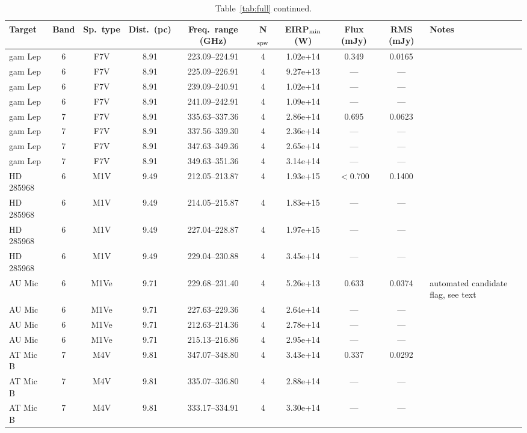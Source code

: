 \documentclass{openjournal}
\begin{document}
\begin{table}
\centering
\scriptsize
\caption{Table~\ref{tab:full} continued.}
\label{tab:full2}
\begin{tabularx}{\textwidth}{@{}l c c c c c c c c X@{}}
\hline
Target & Band & Sp.\ type & Dist.\ (pc) & Freq.\ range (GHz) & N$_{\rm spw}$ & EIRP$_{\rm min}$ (W) & Flux (mJy) & RMS (mJy) & Notes \\
\hline
gam Lep & 6 & F7V & 8.91 & 223.09--224.91 & 4 & 1.02e+14 & 0.349 & 0.0165 &  \\
gam Lep & 6 & F7V & 8.91 & 225.09--226.91 & 4 & 9.27e+13 & --- & --- &  \\
gam Lep & 6 & F7V & 8.91 & 239.09--240.91 & 4 & 1.02e+14 & --- & --- &  \\
gam Lep & 6 & F7V & 8.91 & 241.09--242.91 & 4 & 1.09e+14 & --- & --- &  \\
gam Lep & 7 & F7V & 8.91 & 335.63--337.36 & 4 & 2.86e+14 & 0.695 & 0.0623 &  \\
gam Lep & 7 & F7V & 8.91 & 337.56--339.30 & 4 & 2.36e+14 & --- & --- &  \\
gam Lep & 7 & F7V & 8.91 & 347.63--349.36 & 4 & 2.65e+14 & --- & --- &  \\
gam Lep & 7 & F7V & 8.91 & 349.63--351.36 & 4 & 3.14e+14 & --- & --- &  \\
HD 285968 & 6 & M1V & 9.49 & 212.05--213.87 & 4 & 1.93e+15 & $<$0.700 & 0.1400 &  \\
HD 285968 & 6 & M1V & 9.49 & 214.05--215.87 & 4 & 1.83e+15 & --- & --- &  \\
HD 285968 & 6 & M1V & 9.49 & 227.04--228.87 & 4 & 1.97e+15 & --- & --- &  \\
HD 285968 & 6 & M1V & 9.49 & 229.04--230.88 & 4 & 3.45e+14 & --- & --- &  \\
AU Mic & 6 & M1Ve & 9.71 & 229.68--231.40 & 4 & 5.26e+13 & 0.633 & 0.0374 & automated candidate flag, see text \\
AU Mic & 6 & M1Ve & 9.71 & 227.63--229.36 & 4 & 2.64e+14 & --- & --- &  \\
AU Mic & 6 & M1Ve & 9.71 & 212.63--214.36 & 4 & 2.78e+14 & --- & --- &  \\
AU Mic & 6 & M1Ve & 9.71 & 215.13--216.86 & 4 & 2.95e+14 & --- & --- &  \\
AT Mic B & 7 & M4V & 9.81 & 347.07--348.80 & 4 & 3.43e+14 & 0.337 & 0.0292 &  \\
AT Mic B & 7 & M4V & 9.81 & 335.07--336.80 & 4 & 2.88e+14 & --- & --- &  \\
AT Mic B & 7 & M4V & 9.81 & 333.17--334.91 & 4 & 3.30e+14 & --- & --- &  \\

\end{tabularx}
\end{table}
\end{document}
